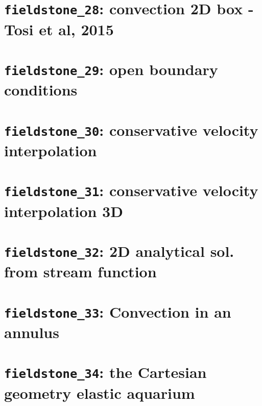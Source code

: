\documentclass[a4paper]{article}
\begin{document}
\newpage
\section{{\tt fieldstone\_28}: convection 2D box - Tosi et al, 2015 \label{f28}}


\newpage
\section{{\tt fieldstone\_29}: open boundary conditions \label{f29}}


\newpage
\section{{\tt fieldstone\_30}: conservative velocity interpolation \label{f30}}


\newpage
\section{{\tt fieldstone\_31}: conservative velocity interpolation 3D \label{f31}}
%

\newpage
\section{{\tt fieldstone\_32}: 2D analytical sol. from stream function \label{f32}}


\newpage
\section{{\tt fieldstone\_33}: Convection in an annulus \label{f33}}


\newpage
\section{{\tt fieldstone\_34}: the Cartesian geometry elastic aquarium \label{f34}}

\end{document}
